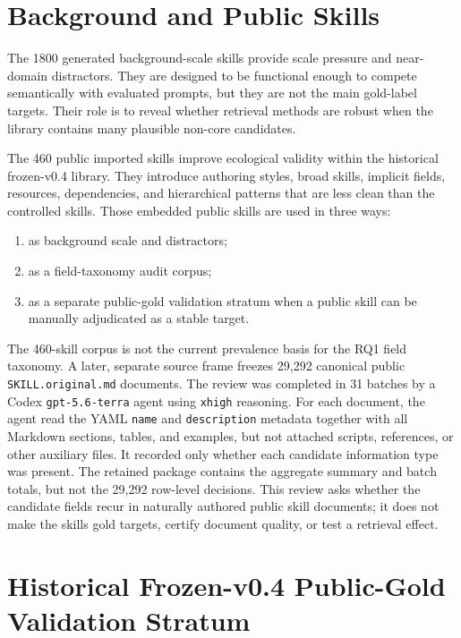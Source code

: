 \section{Background and Public Skills}

The 1800 generated background-scale skills provide scale pressure and near-domain distractors. They are designed to be functional enough to compete semantically with evaluated prompts, but they are not the main gold-label targets. Their role is to reveal whether retrieval methods are robust when the library contains many plausible non-core candidates.

The 460 public imported skills improve ecological validity within the historical frozen-v0.4 library. They introduce authoring styles, broad skills, implicit fields, resources, dependencies, and hierarchical patterns that are less clean than the controlled skills. Those embedded public skills are used in three ways:

\begin{enumerate}
  \item as background scale and distractors;
  \item as a field-taxonomy audit corpus;
  \item as a separate public-gold validation stratum when a public skill can be manually adjudicated as a stable target.
\end{enumerate}

The 460-skill corpus is not the current prevalence basis for the RQ1 field taxonomy. A later, separate source frame freezes 29,292 canonical public \texttt{SKILL.original.md} documents. The review was completed in 31 batches by a Codex \texttt{gpt-5.6-terra} agent using \texttt{xhigh} reasoning. For each document, the agent read the YAML \texttt{name} and \texttt{description} metadata together with all Markdown sections, tables, and examples, but not attached scripts, references, or other auxiliary files. It recorded only whether each candidate information type was present. The retained package contains the aggregate summary and batch totals, but not the 29,292 row-level decisions. This review asks whether the candidate fields recur in naturally authored public skill documents; it does not make the skills gold targets, certify document quality, or test a retrieval effect.

\section{Historical Frozen-v0.4 Public-Gold Validation Stratum}

